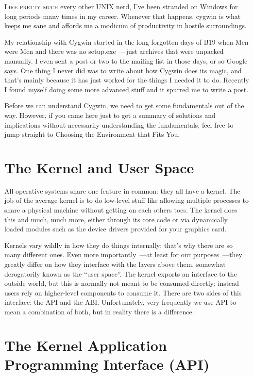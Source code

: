 \documentclass{book}
\begin{document}
\lettrine{L}{ike pretty much} every other UNIX nerd, I've been
stranded on Windows for long periods many times in my career. Whenever
that happens, cygwin is what keeps me sane and affords me a modicum of
productivity in hostile surroundings.

My relationship with Cygwin started in the long forgotten days of B19
when Men were Men and there was no setup.exe~---just archives that were
unpacked manually. I even sent a post or two to the mailing list in
those days, or so Google says. One thing I never did was to write
about how Cygwin does its magic, and that's mainly because it has just
worked for the things I needed it to do. Recently I found myself doing
some more advanced stuff and it spurred me to write a post.

Before we can understand Cygwin, we need to get some fundamentals out
of the way. However, if you came here just to get a summary of
solutions and implications without necessarily understanding the
fundamentals, feel free to jump straight to Choosing the Environment
that Fits You.

\section{The Kernel and User Space}

All operative systems share one feature in common: they all have a
kernel. The job of the average kernel is to do low-level stuff like
allowing multiple processes to share a physical machine without
getting on each others toes. The kernel does this and much, much more,
either through its core code or via dynamically loaded modules such as
the device drivers provided for your graphics card.

Kernels vary wildly in how they do things internally; that's why there
are so many different ones. Even more importantly~---at least for our
purposes~---they greatly differ on how they interface with the layers
above them, somewhat derogatorily known as the ``user space''. The
kernel exports an interface to the outside world, but this is normally
not meant to be consumed directly; instead users rely on higher-level
components to consume it. There are two sides of this interface: the
API and the ABI. Unfortunately, very frequently we use API to mean a
combination of both, but in reality there is a difference.

\section{The Kernel Application Programming Interface (API)}
\end{document}
